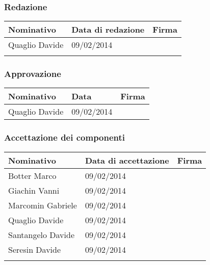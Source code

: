 \subsubsection{Redazione}
\begin{center}
\begin{tabular}{l l l}
\hline
Nominativo & Data di redazione & Firma\\
\hline
Quaglio Davide & 09/02/2014 & \\ %
\hline
\\
\end{tabular}
\end{center}
\subsubsection{Approvazione}
\begin{center}
\begin{tabular}{l l l}
\hline
Nominativo & Data & Firma\\
\hline
Quaglio Davide & 09/02/2014 &  \\ %
\hline
\end{tabular}
\end{center}
\subsubsection{Accettazione dei componenti}
\begin{center}
\begin{tabular}{l l l}
\hline
Nominativo & Data di accettazione & Firma\\
\hline
Botter Marco & 09/02/2014 & \\ %
\hline
Giachin Vanni & 09/02/2014 & \\ %
\hline
Marcomin Gabriele & 09/02/2014 & \\ %
\hline
Quaglio Davide & 09/02/2014 &  \\ %
\hline
Santangelo Davide & 09/02/2014 & \\ %
\hline
Seresin Davide & 09/02/2014 & \\ %
\hline
\\
\end{tabular}
\end{center}
